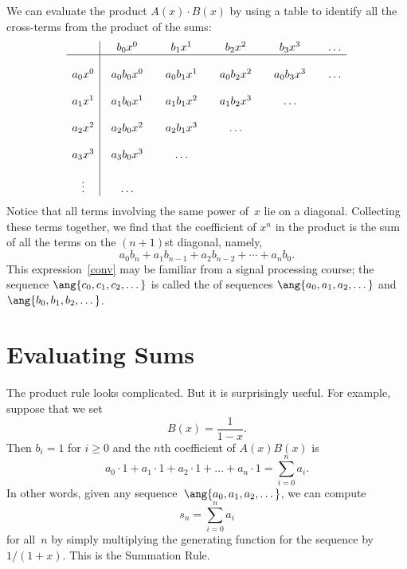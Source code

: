 We can evaluate the product $A(x) \cdot B(x)$ by using a table to identify
all the cross-terms from the product of the sums:
%
\[
\begin{array}{c|@{\quad}c@{\qquad}c@{\qquad}c@{\qquad}c@{\qquad}c}
        & b_0 x^0 & b_1 x^1 & b_2 x^2 & b_3 x^3 & \dots \\
\hline
\\
a_0 x^0 & a_0 b_0 x^0 & a_0 b_1 x^1 & a_0 b_2 x^2 & a_0 b_3 x^3 & \dots \\
\\
a_1 x^1 & a_1 b_0 x^1 & a_1 b_1 x^2 & a_1 b_2 x^3 & \dots \\
\\
a_2 x^2 & a_2 b_0 x^2 & a_2 b_1 x^3 & \dots \\
\\
a_3 x^3 & a_3 b_0 x^3 & \dots \\
\\
\vdots & \dots\\
\end{array}
\]
%
Notice that all terms involving the same power of~$x$ lie on a
diagonal.  Collecting these terms together, we find that the
coefficient of $x^n$ in the product is the sum of all the terms on the
$(n+1)$st diagonal, namely,
\begin{equation}\label{conv}
a_0 b_n + a_1 b_{n-1} + a_2 b_{n-2} + \cdots + a_n b_0.
\end{equation}
This expression~\eqref{conv} may be familiar from a signal processing
course; the sequence $\ang{c_0, c_1, c_2, \dots}$ is called the
 of sequences $\ang{a_0, a_1, a_2, \dots}$ and
$\ang{b_0, b_1, b_2, \dots}$.

\section{Evaluating Sums}

The product rule looks complicated.  But it is surprisingly useful.
For example, suppose that we set
\begin{equation*}
    B(x) = \frac{1}{1 - x}.
\end{equation*}
Then $b_i = 1$ for $i \ge 0$ and the $n$th coefficient of $A(x) B(x)$
is
\begin{equation*}
a_0 \cdot 1 + a_1 \cdot 1 + a_2 \cdot 1 + \dots + a_n \cdot 1
    = \sum_{i = 0}^n a_i.
\end{equation*}
In other words, given any sequence~$\ang{a_0, a_1, a_2, \dots}$, we can
compute
\begin{equation*}
    s_n = \sum_{i = 0}^n a_i
\end{equation*}
for all~$n$ by simply multiplying the generating function for the
sequence by~$1/(1 + x)$.  This is the Summation Rule.

